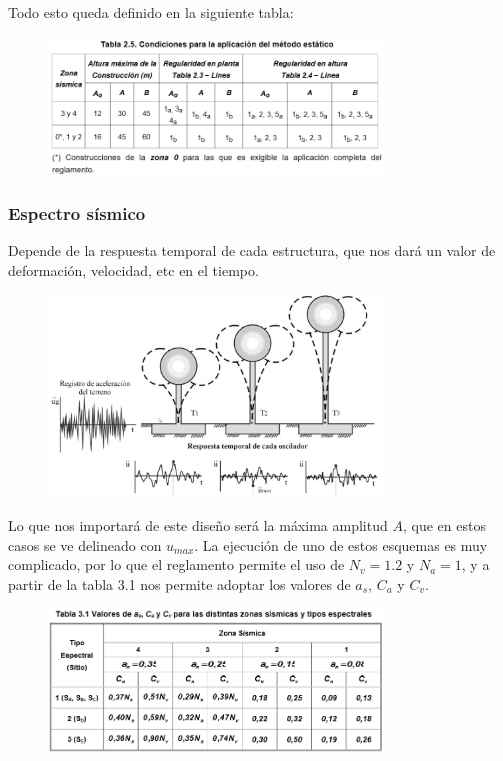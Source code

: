 \documentclass[../main.tex]{subfiles}
\begin{document}
Todo esto queda definido en la siguiente tabla:

\begin{figure}[ht]
  \centering
  \includegraphics[width=0.8\textwidth]{../images/20210420/tabla1}
\end{figure}


\subsubsection{Espectro sísmico} \label{espect}

Depende de la respuesta temporal de cada estructura, que nos dará un valor
de deformación, velocidad, etc en el tiempo.

\begin{figure}[ht]
  \centering
  \includegraphics[width=0.8\textwidth]{../images/20210420/espectro}
\end{figure}

Lo que nos importará de este diseño será la máxima amplitud $A$, que en estos
casos se ve delineado con $u_{max}$. La ejecución de uno de estos esquemas es 
muy complicado, por lo que el reglamento permite el uso de $N_{v}=1.2$ y $N_a=1$,
y a partir de la tabla 3.1 nos permite adoptar los valores de $a_{s}$, $C_{a}$
y $C_v$. 

\begin{figure}[ht]
  \centering
  \includegraphics[width=0.8\textwidth]{../images/20210420/3_1}
\end{figure}
\end{document}
